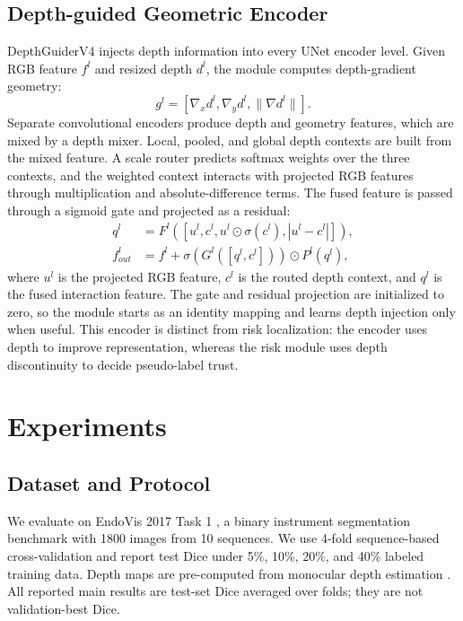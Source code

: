 \documentclass[journal]{IEEEtran}
\begin{document}
\subsection{Depth-guided Geometric Encoder}
DepthGuiderV4 injects depth information into every UNet encoder level. Given RGB feature $f^l$ and resized depth $d^l$, the module computes depth-gradient geometry:
\begin{equation}
g^l=[\nabla_x d^l,\nabla_y d^l,\|\nabla d^l\|].
\end{equation}
Separate convolutional encoders produce depth and geometry features, which are mixed by a depth mixer. Local, pooled, and global depth contexts are built from the mixed feature. A scale router predicts softmax weights over the three contexts, and the weighted context interacts with projected RGB features through multiplication and absolute-difference terms. The fused feature is passed through a sigmoid gate and projected as a residual:
\begin{align}
q^l&=F^l([u^l,c^l,u^l\odot\sigma(c^l),|u^l-c^l|]),\\
f_{out}^l&=f^l+\sigma(G^l([q^l,c^l]))\odot P^l(q^l),
\end{align}
where $u^l$ is the projected RGB feature, $c^l$ is the routed depth context, and $q^l$ is the fused interaction feature. The gate and residual projection are initialized to zero, so the module starts as an identity mapping and learns depth injection only when useful. This encoder is distinct from risk localization: the encoder uses depth to improve representation, whereas the risk module uses depth discontinuity to decide pseudo-label trust.

\section{Experiments}
\subsection{Dataset and Protocol}
We evaluate on EndoVis 2017 Task 1 \cite{allan20192017}, a binary instrument segmentation benchmark with 1800 images from 10 sequences. We use 4-fold sequence-based cross-validation and report test Dice under 5\%, 10\%, 20\%, and 40\% labeled training data. Depth maps are pre-computed from monocular depth estimation \cite{ranftl2021vision}. All reported main results are test-set Dice averaged over folds; they are not validation-best Dice.
\end{document}
